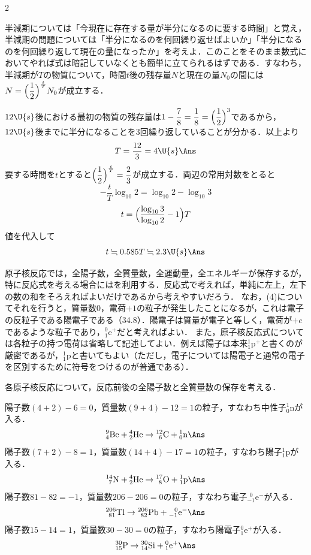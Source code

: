 \begin{multicols}{2}
\par\nopagebreak
\begin{sisin}
半減期については「今現在に存在する量が半分になるのに要する時間」と覚え，半減期の問題については「半分になるのを何回繰り返せばよいか」「半分になるのを何回繰り返して現在の量になったか」を考えよ．このことをそのまま数式においてやれば式は暗記していなくとも簡単に立てられるはずである．すなわち，半減期が$T$の物質について，時間$t$後の残存量$N$と現在の量$N_0$の間には$N=\Bigl(\dfrac{1}{2}\Bigr)^{\frac{t}{T}}N_0$が成立する．
\end{sisin}
\KaiHead
\begin{komon}
 $12\U{s}$後における最初の物質の残存量は$1-\dfrac{7}{8}=\dfrac{1}{8}=\Bigl(\dfrac{1}{2}\Bigr)^3$であるから，$12\U{s}$後までに半分になることを3回繰り返していることが分かる．以上より
       \[T=\frac{12}{3}=4\U{s}\Ans\]
 要する時間を$t$とすると$\Bigl(\dfrac{1}{2}\Bigr)^{\frac{t}{T}}=\dfrac{2}{3}$が成立する．両辺の常用対数をとると
       \[-\frac{t}{T}\log_{10}2=\log_{10}2-\log_{10}3\]
       \[t=\Bigl(\frac{\log_{10}3}{\log_{10}2}-1\Bigr)T\]
       値を代入して
       \[t\fallingdotseq 0.585T\fallingdotseq 2.3\U{s}\Ans\]
\end{komon}

\par\nopagebreak
\begin{sisin}
原子核反応では，全陽子数，全質量数，全運動量，全エネルギーが保存するが，特に反応式を考える場合にはを利用する．反応式で考えれば，単純に左上，左下の数の和をそろえればよいだけであるから考えやすいだろう．
なお，(4)についてそれを行うと，質量数0，電荷$+1$の粒子が発生したことになるが，これは電子の反粒子である{\gtfamily 陽電子}である（34.8）．陽電子は質量が電子と等しく，電荷が$+e$であるような粒子であり，${}^0_1\mathrm{e}^+$だと考えればよい．
また，原子核反応式については各粒子の持つ電荷は省略して記述してよい．例えば陽子は本来${}^1_1\mathrm{p}^+$と書くのが厳密であるが，${}^1_1\mathrm{p}$と書いてもよい（ただし，電子については陽電子と通常の電子を区別するために符号をつけるのが普通である）．
\end{sisin}
\KaiHead
各原子核反応について，反応前後の全陽子数と全質量数の保存を考える．
\begin{komon}
 陽子数$(4+2)-6=0$，質量数$(9+4)-12=1$の粒子，すなわち中性子${}^1_0\mathrm{n}$が入る．
       \[{}^9_4\mathrm{Be}+{}^4_2\mathrm{He}\to{}^{12}_{\ 6}\mathrm{C}+{}^1_0\mathrm{n}\Ans\]
 陽子数$(7+2)-8=1$，質量数$(14+4)-17=1$の粒子，すなわち陽子${}^1_1\mathrm{p}$が入る．
       \[{}^{14}_{\ 7}\mathrm{N}+{}^4_2\mathrm{He}\to{}^{17}_{\ 8}\mathrm{O}+{}^1_1\mathrm{p}\Ans\]
 陽子数$81-82=-1$，質量数$206-206=0$の粒子，すなわち電子${}^{\ \ 0}_{-1}\mathrm{e}^-$が入る．
       \[{}^{206}_{\ 81}\mathrm{Tl}\to{}^{206}_{\ 82}\mathrm{Pb}+{}^{\ \ 0}_{-1}\mathrm{e}^-\Ans\]
 陽子数$15-14=1$，質量数$30-30=0$の粒子，すなわち陽電子${}^0_1\mathrm{e}^+$が入る．
       \[{}^{30}_{15}\mathrm{P}\to{}^{30}_{14}\mathrm{Si}+{}^0_1\mathrm{e}^+\Ans\]
\end{komon}


\end{multicols}
